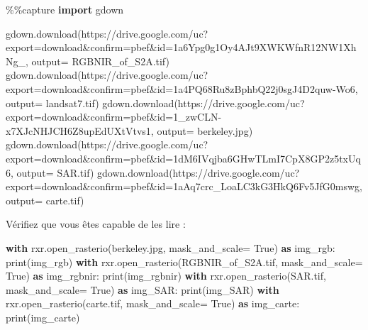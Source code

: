 \documentclass[
]{article}
\newenvironment{Shaded}{}{}
\newcommand{\BuiltInTok}[1]{\textcolor[rgb]{0.00,0.50,0.00}{#1}}
\newcommand{\ControlFlowTok}[1]{\textcolor[rgb]{0.00,0.44,0.13}{\textbf{#1}}}
\newcommand{\ImportTok}[1]{\textcolor[rgb]{0.00,0.50,0.00}{\textbf{#1}}}
\newcommand{\NormalTok}[1]{#1}
\newcommand{\OperatorTok}[1]{\textcolor[rgb]{0.40,0.40,0.40}{#1}}
\newcommand{\StringTok}[1]{\textcolor[rgb]{0.25,0.44,0.63}{#1}}
\newcommand{\VariableTok}[1]{\textcolor[rgb]{0.10,0.09,0.49}{#1}}
\begin{document}
\label{669d08f3}
\label{cb3}
\begin{Shaded}
\begin{Highlighting}[]
\OperatorTok{\%\%}\NormalTok{capture}
\ImportTok{import}\NormalTok{ gdown}

\NormalTok{gdown.download(}\StringTok{\textquotesingle{}https://drive.google.com/uc?export=download\&confirm=pbef\&id=1a6Ypg0g1Oy4AJt9XWKWfnR12NW1XhNg\_\textquotesingle{}}\NormalTok{, output}\OperatorTok{=} \StringTok{\textquotesingle{}RGBNIR\_of\_S2A.tif\textquotesingle{}}\NormalTok{)}
\NormalTok{gdown.download(}\StringTok{\textquotesingle{}https://drive.google.com/uc?export=download\&confirm=pbef\&id=1a4PQ68Ru8zBphbQ22j0sgJ4D2quw{-}Wo6\textquotesingle{}}\NormalTok{, output}\OperatorTok{=} \StringTok{\textquotesingle{}landsat7.tif\textquotesingle{}}\NormalTok{)}
\NormalTok{gdown.download(}\StringTok{\textquotesingle{}https://drive.google.com/uc?export=download\&confirm=pbef\&id=1\_zwCLN{-}x7XJcNHJCH6Z8upEdUXtVtvs1\textquotesingle{}}\NormalTok{, output}\OperatorTok{=} \StringTok{\textquotesingle{}berkeley.jpg\textquotesingle{}}\NormalTok{)}
\NormalTok{gdown.download(}\StringTok{\textquotesingle{}https://drive.google.com/uc?export=download\&confirm=pbef\&id=1dM6IVqjba6GHwTLmI7CpX8GP2z5txUq6\textquotesingle{}}\NormalTok{, output}\OperatorTok{=} \StringTok{\textquotesingle{}SAR.tif\textquotesingle{}}\NormalTok{)}
\NormalTok{gdown.download(}\StringTok{\textquotesingle{}https://drive.google.com/uc?export=download\&confirm=pbef\&id=1aAq7crc\_LoaLC3kG3HkQ6Fv5JfG0mswg\textquotesingle{}}\NormalTok{, output}\OperatorTok{=} \StringTok{\textquotesingle{}carte.tif\textquotesingle{}}\NormalTok{)}
\end{Highlighting}
\end{Shaded}

Vérifiez que vous êtes capable de les lire :

\label{8dfad511}
\label{cb4}
\begin{Shaded}
\begin{Highlighting}[]
\ControlFlowTok{with}\NormalTok{ rxr.open\_rasterio(}\StringTok{\textquotesingle{}berkeley.jpg\textquotesingle{}}\NormalTok{, mask\_and\_scale}\OperatorTok{=} \VariableTok{True}\NormalTok{) }\ImportTok{as}\NormalTok{ img\_rgb:}
    \BuiltInTok{print}\NormalTok{(img\_rgb)}
\ControlFlowTok{with}\NormalTok{ rxr.open\_rasterio(}\StringTok{\textquotesingle{}RGBNIR\_of\_S2A.tif\textquotesingle{}}\NormalTok{, mask\_and\_scale}\OperatorTok{=} \VariableTok{True}\NormalTok{) }\ImportTok{as}\NormalTok{ img\_rgbnir:}
    \BuiltInTok{print}\NormalTok{(img\_rgbnir)}
\ControlFlowTok{with}\NormalTok{ rxr.open\_rasterio(}\StringTok{\textquotesingle{}SAR.tif\textquotesingle{}}\NormalTok{, mask\_and\_scale}\OperatorTok{=} \VariableTok{True}\NormalTok{) }\ImportTok{as}\NormalTok{ img\_SAR:}
    \BuiltInTok{print}\NormalTok{(img\_SAR)}
\ControlFlowTok{with}\NormalTok{ rxr.open\_rasterio(}\StringTok{\textquotesingle{}carte.tif\textquotesingle{}}\NormalTok{, mask\_and\_scale}\OperatorTok{=} \VariableTok{True}\NormalTok{) }\ImportTok{as}\NormalTok{ img\_carte:}
    \BuiltInTok{print}\NormalTok{(img\_carte)}
\end{Highlighting}
\end{Shaded}
\end{document}
